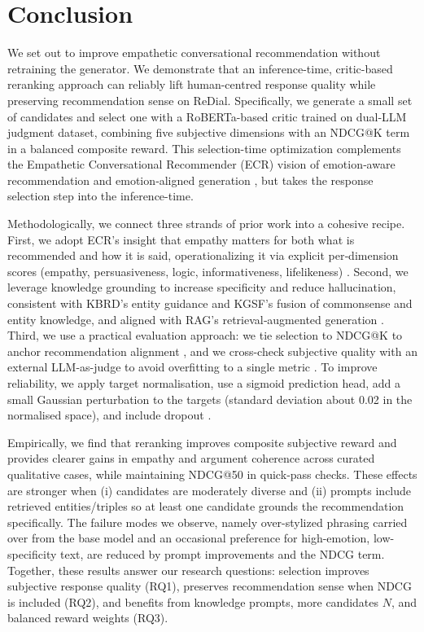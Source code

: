 \documentclass[12pt]{article}
\begin{document}
  \section{Conclusion}
  We set out to improve empathetic conversational recommendation without retraining the generator. We demonstrate that an inference-time, critic-based reranking approach can reliably lift human-centred response quality while preserving recommendation sense on ReDial. Specifically, we generate a small set of candidates and select one with a RoBERTa-based critic trained on dual‑LLM judgment dataset, combining five subjective dimensions with an NDCG@K term in a balanced composite reward. This selection-time optimization complements the Empathetic Conversational Recommender (ECR) vision of emotion‑aware recommendation and emotion‑aligned generation \citep{zhang2024ecr}, but takes the response selection step into the inference-time.
  
  Methodologically, we connect three strands of prior work into a cohesive recipe. First, we adopt ECR's insight that empathy matters for both what is recommended and how it is said, operationalizing it via explicit per‑dimension scores (empathy, persuasiveness, logic, informativeness, lifelikeness) \citep{zhang2024ecr}. Second, we leverage knowledge grounding to increase specificity and reduce hallucination, consistent with KBRD's entity guidance and KGSF's fusion of commonsense and entity knowledge, and aligned with RAG's retrieval‑augmented generation \citep{chen2020kbrd,zhou2020kgsf,speer2017conceptnet,dbpedia_wikipedia,lewis2020rag}. Third, we use a practical evaluation approach: we tie selection to NDCG@K to anchor recommendation alignment \citep{evidently_ndcg}, and we cross-check subjective quality with an external LLM-as-judge to avoid overfitting to a single metric \citep{yan2023llmjudge}. To improve reliability, we apply target normalisation, use a sigmoid prediction head, add a small Gaussian perturbation to the targets (standard deviation about 0.02 in the normalised space), and include dropout \citep{muller2019label_smoothing,srivastava2014dropout}.
  
  Empirically, we find that reranking improves composite subjective reward and provides clearer gains in empathy and argument coherence across curated qualitative cases, while maintaining NDCG@50 in quick‑pass checks. These effects are stronger when (i) candidates are moderately diverse and (ii) prompts include retrieved entities/triples so at least one candidate grounds the recommendation specifically. The failure modes we observe, namely over-stylized phrasing carried over from the base model and an occasional preference for high-emotion, low-specificity text, are reduced by prompt improvements and the NDCG term. Together, these results answer our research questions: selection improves subjective response quality (RQ1), preserves recommendation sense when NDCG is included (RQ2), and benefits from knowledge prompts, more candidates $N$, and balanced reward weights (RQ3).
  
\end{document}
